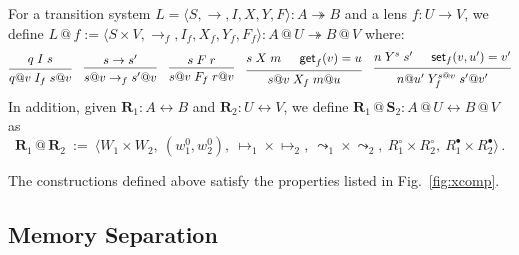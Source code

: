 \documentclass[acmsmall,screen,review,anonymous,nonacm]{acmart}
\newcommand{\kw}[1]{\ensuremath{ \mathsf{#1} }}
\newcommand{\que}{\circ}
\newcommand{\ans}{\bullet}
\newcommand{\intl}[1]{#1^0}
\begin{document}
\begin{definition} \label{def:lift} \label{def:sctens} %
For a transition system
$L = \langle S, {\rightarrow}, I, X, Y, F \rangle : A \twoheadrightarrow B$
and a lens $f : U \rightarrow V$,
we define
$L \mathbin@ f :=
 \langle S \times V, {\rightarrow_f}, I_f, X_f, Y_f, F_f \rangle
 : A \mathbin@ U \twoheadrightarrow B \mathbin@ V$
where:
\begin{gather*}
 {\begin{prooftree}
    \hypo{q \mathrel{I} s}
    \infer1{q@v \mathrel{I_f} s@ v}
  \end{prooftree}}
  \quad
 {\begin{prooftree}
    \hypo{s \rightarrow s'}
    \infer1{s@v \rightarrow_f s'@v}
  \end{prooftree}}
  \quad
 {\begin{prooftree}
    \hypo{s \mathrel{F} r}
    \infer1{s@v \mathrel{F_f} r@v}
  \end{prooftree}}
  \quad
 {\begin{prooftree}
    \hypo{s \mathrel{X} m}
    \hypo{\kw{get}_f(v) = u}
    \infer2{s@v \mathrel{X_f} m@u}
  \end{prooftree}}
  \quad
 {\begin{prooftree}
    \hypo{n \mathrel{Y}^s s'}
    \hypo{\kw{set}_f(v, u') = v'}
    \infer2{n@u' \mathrel{Y^{s@v}_f} s'@v'}
  \end{prooftree}}
\end{gather*}
In addition,
given $\mathbf{R}_1 : A \leftrightarrow B$
and $\mathbf{R}_2 : U \leftrightarrow V$,
we define
$\mathbf{R}_1 \mathbin@ \mathbf{S}_2 :
 A \mathbin@ U \leftrightarrow B \mathbin@ V$
as
\[
  \mathbf{R}_1 \mathbin@ \mathbf{R}_2 \: := \:
    \big\langle
      W_1 \times W_2, \:
      (\intl{w}_1, \intl{w}_2), \:
      {\mapsto_1} \times {\mapsto_2}, \:
      {\leadsto_1} \times {\leadsto_2}, \:
      R_1^\que \times R_2^\que, \:
      R_1^\ans \times R_2^\ans
    \big\rangle
  \,.
\]
\end{definition}

\begin{theorem} %
The constructions defined above
satisfy the properties listed in Fig.~\ref{fig:xcomp}.
\end{theorem}


\subsection{Memory Separation} \label{sec:overview:sepalg} %
\end{document}
